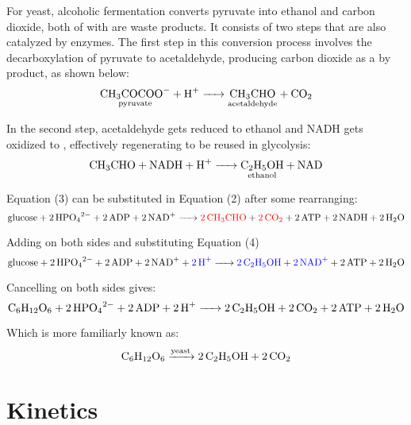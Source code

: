 \documentclass{article}
\begin{document}
\medskip

For yeast,  alcoholic fermentation converts pyruvate into ethanol and carbon dioxide, both of with are waste products. It consists of two steps that are also catalyzed by enzymes. The first step in this conversion process involves the decarboxylation of pyruvate to acetaldehyde, producing carbon dioxide as a by product, as shown below:
\begin{equation}
    \ce{\underset{\text{pyruvate}}{\ce{CH3COCOO-}} + H+ -> \underset{\text{acetaldehyde}}{\ce{CH3CHO}} + CO2}
\end{equation}

In the second step, acetaldehyde gets reduced to ethanol and NADH gets oxidized to , effectively regenerating  to be reused in glycolysis:
\begin{equation}
    \ce{CH3CHO + NADH + H+ -> \underset{\text{ethanol}}{\ce{C2H5OH}} + NAD}
\end{equation}

Equation (3) can be substituted in Equation (2) after some rearranging:
\begin{equation*}
    \ce{glucose + 2HPO_{4}^{2-} + 2ADP + 2NAD+ -> \textcolor{red}{\ce{2CH3CHO}} + \textcolor{red}{\ce{2CO2}} + 2ATP + 2NADH + 2H2O}
\end{equation*}

Adding  on both sides and substituting Equation (4)
\begin{equation*}
    \ce{glucose + 2HPO_{4}^{2-} + 2ADP + 2NAD+ + \textcolor{blue}{\ce{2H+}} -> \textcolor{blue}{\ce{2C2H5OH}} + \textcolor{blue}{\ce{2NAD+}} + 2ATP + 2H2O}
\end{equation*}

Cancelling  on both sides gives:
\begin{equation}
    \ce{C6H12O6 + 2HPO_{4}^{2-} + 2ADP + 2H+ -> 2C2H5OH + 2CO2 + 2ATP + 2H2O}
\end{equation}

Which is more familiarly known as:
\begin{equation}
    \ce{C6H12O6 ->[yeast] 2C2H5OH + 2CO2}
\end{equation}

\section{Kinetics}  %
\end{document}
